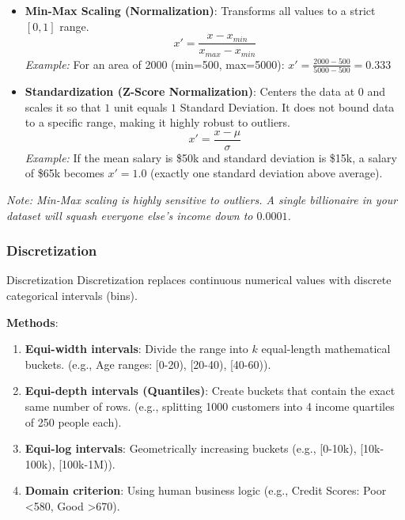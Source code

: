\begin{itemize}
    \item \textbf{Min-Max Scaling (Normalization)}: Transforms all values to a strict $[0, 1]$ range.
    \begin{equation}
        x' = \frac{x - x_{min}}{x_{max} - x_{min}}
    \end{equation}
    \textit{Example:} For an area of 2000 (min=500, max=5000): $x' = \frac{2000 - 500}{5000 - 500} = 0.333$
    
    \vspace{0.2cm}
    \item \textbf{Standardization (Z-Score Normalization)}: Centers the data at $0$ and scales it so that $1$ unit equals $1$ Standard Deviation. It does not bound data to a specific range, making it highly robust to outliers.
    \begin{equation}
        x' = \frac{x - \mu}{\sigma}
    \end{equation}
    \textit{Example:} If the mean salary is \$50k and standard deviation is \$15k, a salary of \$65k becomes $x' = 1.0$ (exactly one standard deviation above average).
\end{itemize}

\textit{Note: Min-Max scaling is highly sensitive to outliers. A single billionaire in your dataset will squash everyone else's income down to $0.0001$.}

\subsubsection{Discretization }

\begin{defbox}{Discretization}
Discretization replaces continuous numerical values with discrete categorical intervals (bins).
\end{defbox}

\textbf{Methods}:
\begin{enumerate}
    \item \textbf{Equi-width intervals}: Divide the range into $k$ equal-length mathematical buckets. (e.g., Age ranges: [0-20), [20-40), [40-60)).
    \item \textbf{Equi-depth intervals (Quantiles)}: Create buckets that contain the exact same number of rows. (e.g., splitting 1000 customers into 4 income quartiles of 250 people each).
    \item \textbf{Equi-log intervals}: Geometrically increasing buckets (e.g., [0-10k), [10k-100k), [100k-1M)).
    \item \textbf{Domain criterion}: Using human business logic (e.g., Credit Scores: Poor <580, Good >670).
\end{enumerate}


